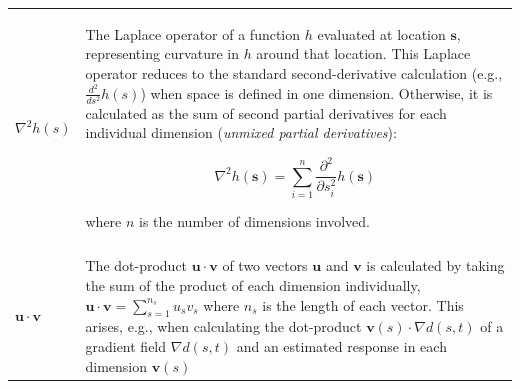 \begin{table}
\begin{center}
\begin{tabularx}{\textwidth}{ | X m{4in} | }
  \( \nabla^2 h(s) \) & The Laplace operator of a function \(h\) evaluated at location \(\mathbf{s}\), representing curvature in \(h\) around that location.  This Laplace operator reduces to the standard second-derivative calculation (e.g., \( \frac{d^2}{ds^2} h(s) \)) when space is defined in one dimension.  Otherwise, it is calculated as the sum of second partial derivatives for each individual dimension (\textit{unmixed partial derivatives}):

\begin{equation}
    \nabla^2 h(\mathbf{s}) = \sum_{i=1}^{n} \frac{\partial^2}{\partial s_i^2} h(\mathbf{s})
\end{equation}

  where \(n\) is the number of dimensions involved. \\ & \\

  \( \mathbf{u} \cdot \mathbf{v} \) & The dot-product \(\mathbf{u} \cdot \mathbf{v}\) of two vectors \(\mathbf{u}\) and \(\mathbf{v}\) is calculated by taking the sum of the product of each dimension individually, \( \mathbf{u} \cdot \mathbf{v} = \sum_{s=1}^{n_s} u_s v_s \) where \(n_s\) is the length of each vector.  This arises, e.g., when calculating the dot-product \( \mathbf{v}(s) \cdot \nabla d(s,t) \) of a gradient field \(\nabla d(s,t)\) and an estimated response in each dimension \( \mathbf{v}(s) \) \\

  \hline
\end{tabularx}
  \label{tab:Appendix_expression}
\end{center}
\end{table}

